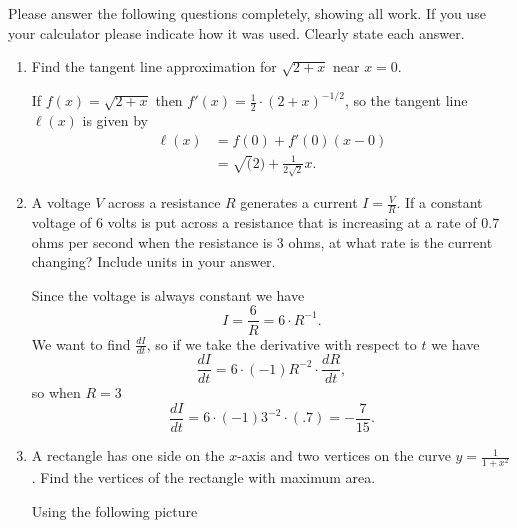 \documentclass[11pt]{article}
\begin{document}
\drawtitle

\noindent Please answer the following questions completely, showing all work.
If you use your calculator please indicate how it was used.  Clearly
state each answer.

\begin{enumerate}
\item Find the tangent line approximation for $\sqrt{2 + x}$ near
  $x=0$.

  \vfill
  {\color{blue}
  If $f(x)=\sqrt{2+x}$ then $f'(x)=\frac{1}{2}\cdot(2+x)^{-1/2}$, so
  the tangent line $\ell(x)$ is given by
  \begin{align*}
    \ell(x) &= f(0) + f'(0)(x - 0) \\
    &= \sqrt(2) + \frac{1}{2\sqrt{2}}x.
  \end{align*}
  }
  \vfill

\item A voltage $V$ across a resistance $R$ generates a current
  $I=\frac{V}{R}$.  If a constant voltage of 6 volts is put across a
  resistance that is increasing at a rate of $0.7$ ohms per second
  when the resistance is 3 ohms, at what rate is the current
  changing?  Include units in your answer.

  \vfill
  {\color{blue}
  Since the voltage is always constant we have
  \[
  I=\frac{6}{R}=6\cdot R^{-1}.
  \]
  We want to find $\frac{dI}{dt}$, so if we take the derivative with
  respect to $t$ we have
  \[
  \frac{dI}{dt}=6\cdot(-1)R^{-2}\cdot\frac{dR}{dt},
  \]
  so when $R=3$
  \[
  \frac{dI}{dt} = 6\cdot (-1)3^{-2}\cdot (.7) = -\frac{7}{15}.
  \]
  }
  \vfill
  \newpage
  
\item A rectangle has one side on the $x$-axis and two vertices on the
  curve $y=\frac{1}{1 + x^2}$. Find the vertices of the rectangle with
  maximum area.

  \vfill
  {\color{blue}  
  Using the following picture
  \begin{center}
\end{center}}
\end{enumerate}
\end{document}
